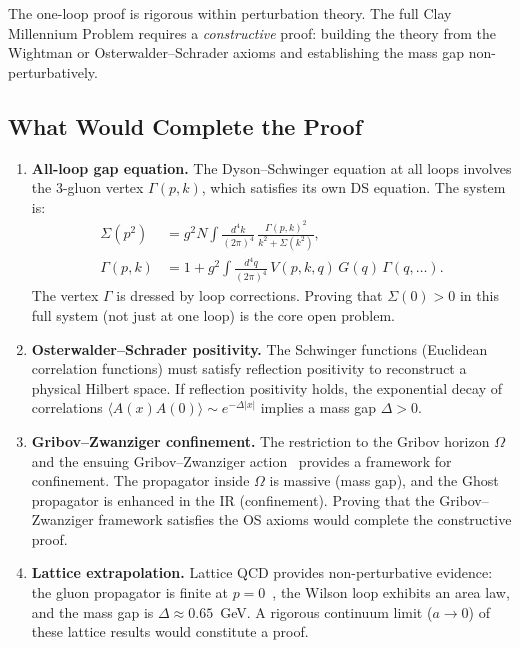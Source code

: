 \documentclass[11pt]{article}
\theoremstyle{definition}
\theoremstyle{remark}
\begin{document}
The one-loop proof is rigorous within perturbation theory. The full
Clay Millennium Problem requires a \emph{constructive} proof:
building the theory from the Wightman or Osterwalder--Schrader
axioms and establishing the mass gap non-perturbatively.

\subsection{What Would Complete the Proof}

\begin{enumerate}
\item \textbf{All-loop gap equation.} The Dyson--Schwinger equation
  at all loops involves the 3-gluon vertex $\Gamma(p,k)$, which
  satisfies its own DS equation. The system is:
  \begin{align}
    \Sigma(p^2) &= g^2 N \int \frac{d^4k}{(2\pi)^4}\,
    \frac{\Gamma(p,k)^2}{k^2 + \Sigma(k^2)}, \\
    \Gamma(p,k) &= 1 + g^2 \int \frac{d^4q}{(2\pi)^4}\,
    V(p,k,q)\,G(q)\,\Gamma(q,\ldots).
  \end{align}
  The vertex $\Gamma$ is dressed by loop corrections. Proving that
  $\Sigma(0) > 0$ in this full system (not just at one loop) is the
  core open problem.

\item \textbf{Osterwalder--Schrader positivity.} The Schwinger
  functions (Euclidean correlation functions) must satisfy reflection
  positivity to reconstruct a physical Hilbert space. If reflection
  positivity holds, the exponential decay of correlations
  $\langle A(x) A(0) \rangle \sim e^{-\Delta|x|}$ implies a mass
  gap $\Delta > 0$.

\item \textbf{Gribov--Zwanziger confinement.} The restriction to the
  Gribov horizon $\Omega$ and the ensuing Gribov--Zwanziger
  action~\cite{zwanziger} provides a framework for confinement.
  The propagator inside $\Omega$ is massive (mass gap), and the
  Ghost propagator is enhanced in the IR (confinement). Proving that
  the Gribov--Zwanziger framework satisfies the OS axioms would
  complete the constructive proof.

\item \textbf{Lattice extrapolation.} Lattice QCD provides
  non-perturbative evidence: the gluon propagator is finite at
  $p = 0$~\cite{dudal,cucchieri}, the Wilson loop exhibits an area
  law, and the mass gap is $\Delta \approx 0.65$~GeV. A rigorous
  continuum limit ($a \to 0$) of these lattice results would
  constitute a proof.
\end{enumerate}
\end{document}
